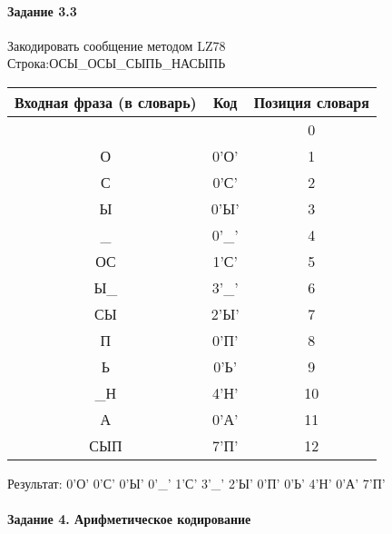 \documentclass[a4paper, 12pt]{article}
\begin{document}
\paragraph{Задание 3.3}

Закодировать сообщение методом LZ78\\
Строка:ОСЫ\_ОСЫ\_СЫПЬ\_НАСЫПЬ\\
\begin{table}[h!]
\centering
\begin{tabular}{|c|c|c|} 
\hline
 Входная фраза (в словарь) & Код & Позиция словаря \\ \hline

 &  & 0 \\ \hline
О & 0'О' & 1 \\ \hline
С & 0'С' & 2 \\ \hline
Ы & 0'Ы' & 3 \\ \hline
\_ & 0'\_' & 4 \\ \hline
ОС & 1'С' & 5 \\ \hline
Ы\_ & 3'\_' & 6 \\ \hline
СЫ & 2'Ы' & 7 \\ \hline
П & 0'П' & 8 \\ \hline
Ь & 0'Ь' & 9 \\ \hline
\_Н & 4'Н' & 10 \\ \hline
А & 0'А' & 11 \\ \hline
СЫП & 7'П' & 12 \\ \hline
\end{tabular}
\end{table}

Результат: 0'О' 0'С' 0'Ы' 0'\_' 1'С' 3'\_' 2'Ы' 0'П' 0'Ь' 4'Н' 0'А' 7'П'\\
\pagebreak
\paragraph{Задание 4. Арифметическое кодирование\\}
\end{document}
